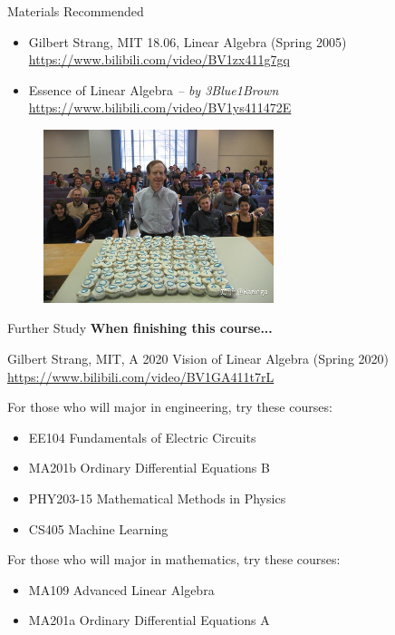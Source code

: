 \documentclass{beamer}
\begin{document}
\begin{frame}{Materials Recommended}
\begin{itemize}
    \item  Gilbert Strang, MIT 18.06, Linear Algebra (Spring 2005) \\
    \url{https://www.bilibili.com/video/BV1zx411g7gq}
    \item Essence of Linear Algebra \textit{-- by 3Blue1Brown} \\
    \url{https://www.bilibili.com/video/BV1ys411472E}
\end{itemize}

\begin{figure}
    \centering
    \includegraphics[width=0.6\textwidth]{Gilbert.jpeg}
\end{figure}

\end{frame}

\begin{frame}{Further Study}
\textbf{When finishing this course...}
\vspace{5pt}

Gilbert Strang, MIT, A 2020 Vision of Linear Algebra (Spring 2020)
\url{https://www.bilibili.com/video/BV1GA411t7rL}
\vspace{5pt}

For those who will major in engineering, try these courses:
\begin{itemize}
    \item EE104 Fundamentals of Electric Circuits
    \item MA201b Ordinary Differential Equations B
    \item PHY203-15 Mathematical Methods in Physics
    \item CS405 Machine Learning
\end{itemize}

For those who will major in mathematics, try these courses:
\begin{itemize}
    \item MA109 Advanced Linear Algebra
    \item MA201a Ordinary Differential Equations A
\end{itemize}


\end{frame}
\end{document}
